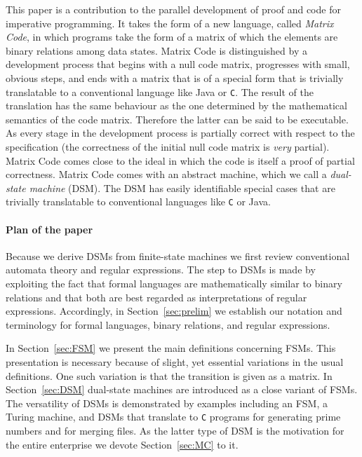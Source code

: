 \documentclass[preprint,11pt]{elsarticle}
\begin{document}
This paper is a contribution to the parallel development
of proof and code for imperative programming.
It takes the form of a new language,
called \emph{Matrix Code},
in which programs take the form of a matrix
of which the elements are binary relations among data states.
Matrix Code is distinguished by a development process
that begins with a
null code matrix, progresses with small, obvious steps, and
ends with a matrix that is of a special form that
is trivially translatable to a conventional language
like Java or {\tt C}.
The result of the translation has the same behaviour
as the one determined by the mathematical semantics of the code matrix.
Therefore the latter can be said to be executable.
As every stage in the development process is partially correct
with respect to the specification
(the correctness of the initial null code matrix
is \emph{very} partial).
Matrix Code comes close to the ideal in which
the code is itself a proof of partial correctness.
Matrix Code comes with an abstract machine,
which we call a \emph{dual-state machine} (DSM).
The DSM has easily identifiable special cases that are
trivially translatable to conventional languages like {\tt C} or Java.

\paragraph{Plan of the paper}

Because we derive DSMs from finite-state machines
we first review conventional automata theory
and regular expressions.
The step to DSMs is made by exploiting
the fact that formal languages
are mathematically similar to binary relations
and that both are best regarded as interpretations of
regular expressions.
Accordingly, in Section~\ref{sec:prelim} we establish
our notation and terminology for formal languages, binary
relations, and regular expressions. 

In Section~\ref{sec:FSM} 
we present the main definitions concerning FSMs.
This presentation is necessary because of slight,
yet essential variations in the usual definitions.
One such variation is that the transition is given as a matrix. 
In Section~\ref{sec:DSM} dual-state machines are
introduced as a close variant of FSMs.
The versatility of DSMs is demonstrated
by examples including an FSM, a Turing machine,
and DSMs that translate to {\tt C} programs for generating
prime numbers and for merging files.
As the latter type of DSM is the motivation for the
entire enterprise we devote Section~\ref{sec:MC}
to it.
\end{document}

